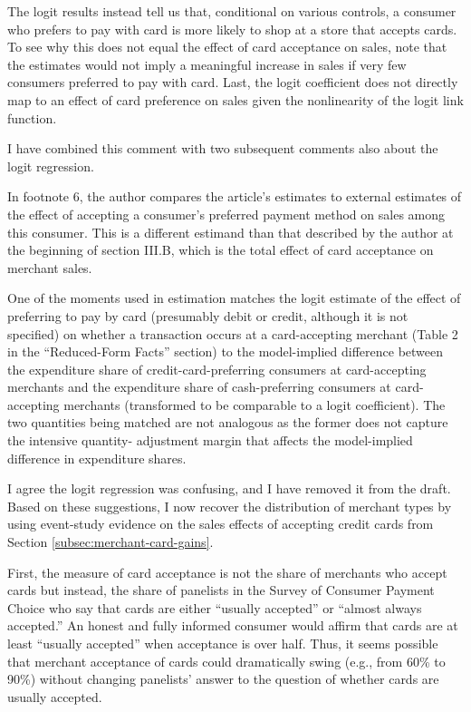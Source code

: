 \documentclass[main.tex]{subfiles}
\begin{document}
\begin{refsection}
\begin{refcomment}
The logit results instead tell us that, conditional on various controls, a consumer who prefers to pay with card is more likely to shop at a store that accepts cards.
To see why this does not equal the effect of card acceptance on sales, note that the estimates would not imply a meaningful increase in sales if very few consumers preferred to pay with card.
Last, the logit coefficient does not directly map to an effect of card preference on sales given the nonlinearity of the logit link function.
\end{refcomment}

I have combined this comment with two subsequent comments also about the logit regression.

\begin{refcommentnoclear}
    In footnote 6, the author compares the article’s estimates to external estimates of the effect of accepting a consumer’s preferred payment method on sales among this consumer.
This is a different estimand than that described by the author at the beginning of section III.B, which is the total effect of card acceptance on merchant sales.
\end{refcommentnoclear}

\begin{refcommentnoclear}
    One of the moments used in estimation matches the logit estimate of the effect of preferring to pay by card (presumably debit or credit, although it is not specified) on whether a transaction occurs at a card-accepting merchant (Table 2 in the “Reduced-Form Facts” section) to the model-implied difference between the expenditure share of credit-card-preferring consumers at card-accepting merchants and the expenditure share of cash-preferring consumers at card-accepting merchants (transformed to be comparable to a logit coefficient).
The two quantities being matched are not analogous as the former does not capture the intensive quantity- adjustment margin that affects the model-implied difference in expenditure shares.
\end{refcommentnoclear}
    
I agree the logit regression was confusing, and I have removed it from the draft.
Based on these suggestions, I now recover the distribution of merchant types by using event-study evidence on the sales effects of accepting credit cards from Section \ref{subsec:merchant-card-gains}.

\replymerchanttypes

\begin{refcommentnoclear}
First, the measure of card acceptance is not the share of merchants who accept cards but instead, the share of panelists in the Survey of Consumer Payment Choice who say that cards are either “usually accepted” or “almost always accepted.” An honest and fully informed consumer would affirm that cards are at least “usually accepted” when acceptance is over half.
Thus, it seems possible that merchant acceptance of cards could dramatically swing (e.g., from 60\% to 90\%) without changing panelists’ answer to the question of whether cards are usually accepted.


\end{refcommentnoclear}
\end{refsection}
\end{document}
